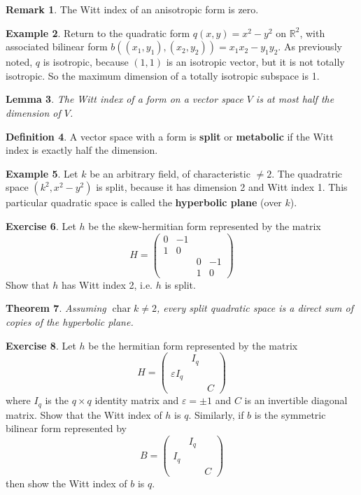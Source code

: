 \documentclass[12pt]{article}
\newtheorem{theorem}{Theorem}
\newtheorem{lemma}[theorem]{Lemma}
\theoremstyle{definition}
\newtheorem{definition}[theorem]{Definition}
\newtheorem{example}[theorem]{Example}
\newtheorem{remark}[theorem]{Remark}
\newtheorem{exercise}[theorem]{Exercise}
\newcommand{\R}{\mathbb{R}}
\newcommand{\eps}{\varepsilon}
\newcommand{\tbf}{\textbf}
\DeclareMathOperator{\characteristic}{char}
\begin{document}
\begin{remark}
The Witt index of an anisotropic form is zero.
\end{remark}

\begin{example}
Return to the quadratic form $q(x,y) = x^2 - y^2$ on $\R^2$, with associated bilinear form $b((x_1, y_1), (x_2, y_2)) = x_1 x_2 - y_1 y_2$. As previously noted, $q$ is isotropic, because $(1,1)$ is an isotropic vector, but it is not totally isotropic. So the maximum dimension of a totally isotropic subspace is 1.
\end{example}

\begin{lemma}
The Witt index of a form on a vector space $V$ is at most half the dimension of $V$.
\end{lemma}

\begin{definition}
A vector space with a form is \tbf{split} or \tbf{metabolic} if the Witt index is exactly half the dimension.
\end{definition}

\begin{example}
Let $k$ be an arbitrary field, of characteristic $\neq 2$. The quadratric space $(k^2, x^2 - y^2)$ is split, because it has dimension 2 and Witt index 1. This particular quadratic space is called the \tbf{hyperbolic plane} (over $k$).
\end{example}

\begin{exercise}
Let $h$ be the skew-hermitian form represented by the matrix
\[
	H = 
	\begin{pmatrix}
		0 & -1 \\
		1 & 0 \\
		&& 0 & -1 \\
		&& 1 & 0
	\end{pmatrix}
\]
Show that $h$ has Witt index 2, i.e. $h$ is split.
\end{exercise}

\begin{theorem}
Assuming $\characteristic k \neq 2$, every split quadratic space is a direct sum of copies of the hyperbolic plane.
\end{theorem}

\begin{exercise}
Let $h$ be the hermitian form represented by the matrix
\[
	H =
	\begin{pmatrix}
		& I_q \\
		\eps I_q \\
		&& C
	\end{pmatrix}
\]
where $I_q$ is the $q \times q$ identity matrix and $\eps = \pm 1$ and $C$ is an invertible diagonal matrix. Show that the Witt index of $h$ is $q$. Similarly, if $b$ is the symmetric bilinear form represented by
\[
	B =
	\begin{pmatrix}
		& I_q \\
		I_q \\
		&& C
	\end{pmatrix}
\]
then show the Witt index of $b$ is $q$.
\end{exercise}
\end{document}
